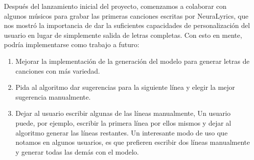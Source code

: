 \documentclass[12pt, a4paper, titlepage]{report}
\begin{document}
Después del lanzamiento inicial del proyecto, comenzamos a colaborar con algunos músicos para grabar las primeras canciones escritas por NeuraLyrics, que nos mostró la importancia de dar la
suficientes capacidades de personalización del usuario en lugar de simplemente
salida de letras completas. Con esto en mente, podría implementarse como trabajo a futuro:
\begin{enumerate} 
\item Mejorar la implementación de la generación del modelo para generar letras de canciones con más variedad.

\item Pida al algoritmo dar sugerencias para la siguiente línea y elegir la mejor sugerencia manualmente.

\item Dejar al usuario escribir algunas de las líneas manualmente, Un usuario puede, por ejemplo, escribir la primera línea por ellos mismos y dejar al algoritmo generar las líneas restantes. Un interesante modo de uso que notamos en algunos usuarios, es que prefieren escribir dos líneas manualmente y generar todas las demás con el modelo.


\end{enumerate}
\end{document}
